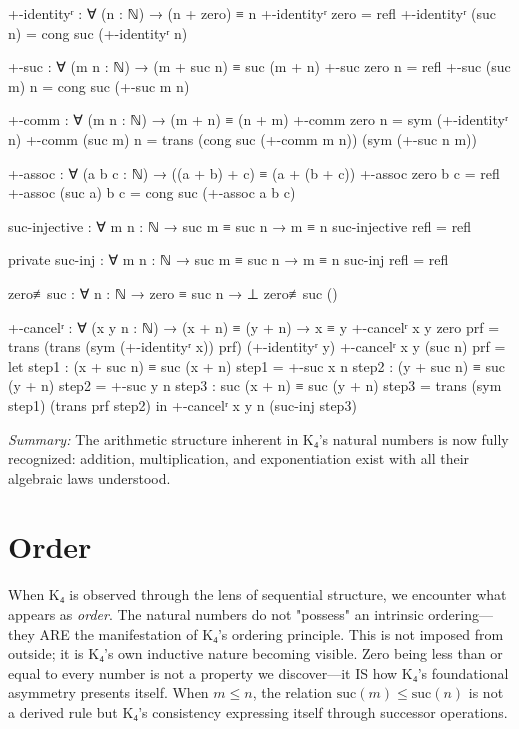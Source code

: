\documentclass[11pt,a4paper]{book}
\begin{document}
\begin{code}
+-identityʳ : ∀ (n : ℕ) → (n + zero) ≡ n
+-identityʳ zero    = refl
+-identityʳ (suc n) = cong suc (+-identityʳ n)

+-suc : ∀ (m n : ℕ) → (m + suc n) ≡ suc (m + n)
+-suc zero    n = refl
+-suc (suc m) n = cong suc (+-suc m n)

+-comm : ∀ (m n : ℕ) → (m + n) ≡ (n + m)
+-comm zero    n = sym (+-identityʳ n)
+-comm (suc m) n = trans (cong suc (+-comm m n)) (sym (+-suc n m))

+-assoc : ∀ (a b c : ℕ) → ((a + b) + c) ≡ (a + (b + c))
+-assoc zero    b c = refl
+-assoc (suc a) b c = cong suc (+-assoc a b c)

suc-injective : ∀ {m n : ℕ} → suc m ≡ suc n → m ≡ n
suc-injective refl = refl

private
  suc-inj : ∀ {m n : ℕ} → suc m ≡ suc n → m ≡ n
  suc-inj refl = refl

zero≢suc : ∀ {n : ℕ} → zero ≡ suc n → ⊥
zero≢suc ()

+-cancelʳ : ∀ (x y n : ℕ) → (x + n) ≡ (y + n) → x ≡ y
+-cancelʳ x y zero prf = 
  trans (trans (sym (+-identityʳ x)) prf) (+-identityʳ y)
+-cancelʳ x y (suc n) prf = 
  let step1 : (x + suc n) ≡ suc (x + n)
      step1 = +-suc x n
      step2 : (y + suc n) ≡ suc (y + n)
      step2 = +-suc y n
      step3 : suc (x + n) ≡ suc (y + n)
      step3 = trans (sym step1) (trans prf step2)
  in +-cancelʳ x y n (suc-inj step3)

\end{code}

\medskip
\noindent\textit{Summary:} The arithmetic structure inherent in K₄'s natural numbers is now fully recognized: addition, multiplication, and exponentiation exist with all their algebraic laws understood.

\chapter{Order}

When K₄ is observed through the lens of sequential structure, we encounter what appears as \emph{order}. The natural numbers do not "possess" an intrinsic ordering—they ARE the manifestation of K₄'s ordering principle. This is not imposed from outside; it is K₄'s own inductive nature becoming visible. Zero being less than or equal to every number is not a property we discover—it IS how K₄'s foundational asymmetry presents itself. When $m \le n$, the relation $\mathrm{suc}(m) \le \mathrm{suc}(n)$ is not a derived rule but K₄'s consistency expressing itself through successor operations.
\end{document}
